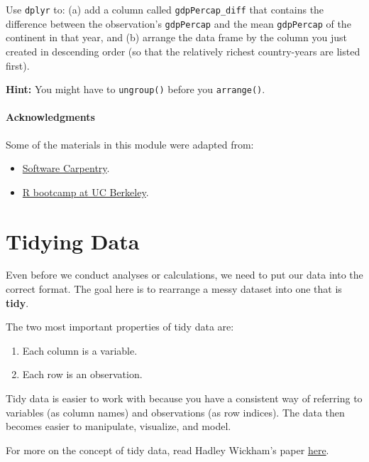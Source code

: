 \documentclass[
]{book}
\providecommand{\tightlist}{%
  \setlength{\itemsep}{0pt}\setlength{\parskip}{0pt}}
\begin{document}
Use \texttt{dplyr} to: (a) add a column called \texttt{gdpPercap\_diff} that contains the difference between the observation's \texttt{gdpPercap} and the mean \texttt{gdpPercap} of the continent in that year, and (b) arrange the data frame by the column you just created in descending order (so that the relatively richest country-years are listed first).

\textbf{Hint:} You might have to \texttt{ungroup()} before you \texttt{arrange()}.

\hypertarget{acknowledgments-2}{%
\subsubsection*{Acknowledgments}\label{acknowledgments-2}}

Some of the materials in this module were adapted from:

\begin{itemize}
\tightlist
\item
  \href{http://swcarpentry.github.io/r-novice-gapminder/}{Software Carpentry}.
\item
  \href{https://github.com/berkeley-scf/r-bootcamp-fall-2019}{R bootcamp at UC Berkeley}.
\end{itemize}

\hypertarget{tidying-data}{%
\chapter{Tidying Data}\label{tidying-data}}

Even before we conduct analyses or calculations, we need to put our data into the correct format. The goal here is to rearrange a messy dataset into one that is \textbf{tidy}.

The two most important properties of tidy data are:

\begin{enumerate}
\def\labelenumi{\arabic{enumi})}
\tightlist
\item
  Each column is a variable.
\item
  Each row is an observation.
\end{enumerate}

Tidy data is easier to work with because you have a consistent way of referring to variables (as column names) and observations (as row indices). The data then becomes easier to manipulate, visualize, and model.

For more on the concept of tidy data, read Hadley Wickham's paper \href{http://vita.had.co.nz/papers/tidy-data.html}{here}.
\end{document}
